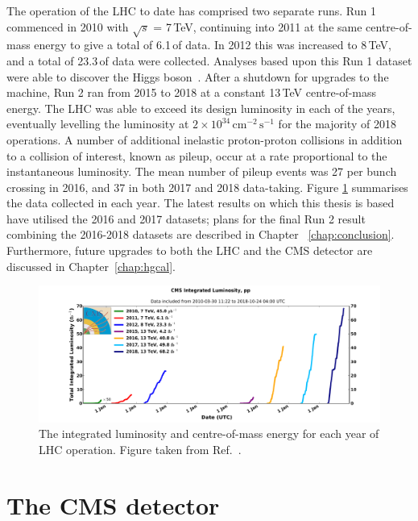 The operation of the LHC to date has comprised two separate runs.
Run 1 commenced in 2010 with $\sqrt{s}$ = 7\,TeV, continuing into 2011 at the same centre-of-mass energy to give a total of 6.1\,\fb of data.
In 2012 this was increased to 8\,TeV, and a total of 23.3\,\fb of data were collected.
Analyses based upon this Run 1 dataset were able to discover the Higgs boson~\cite{ATLASdiscovery,CMSdiscovery}.
After a shutdown for upgrades to the machine, Run 2 ran from 2015 to 2018 at a constant 13\,TeV centre-of-mass energy.
The LHC was able to exceed its design luminosity in each of the years, eventually levelling the luminosity at $2\times10^{34}\,\textrm{cm}^{-2}\,\textrm{s}^{-1}$ for the majority of 2018 operations.
A number of additional inelastic proton-proton collisions in addition to a collision of interest, known as pileup, occur at a rate proportional to the instantaneous luminosity.
The mean number of pileup events was 27 per bunch crossing in 2016, and 37 in both 2017 and 2018 data-taking.
Figure \ref{fig:detector_Run1andRun2lumi} summarises the data collected in each year.
The latest \Hgg results on which this thesis is based have utilised the 2016 and 2017 datasets; 
plans for the final Run 2 result combining the 2016-2018 datasets are described in Chapter ~\ref{chap:conclusion}.
Furthermore, future upgrades to both the LHC and the CMS detector are discussed in Chapter~\ref{chap:hgcal}.

\begin{figure}[h!]
  \centering
  \includegraphics[width=\textwidth]{Figures/Detector/Run1andRun2lumi.pdf}
  \caption[LHC integrated luminosity and centre-of-mass energy per year.]
  {The integrated luminosity and centre-of-mass energy for each year of LHC operation.
  Figure taken from Ref.~\cite{CMSLumiPublic}.}
  \label{fig:detector_Run1andRun2lumi}
\end{figure}

\section{The CMS detector}

